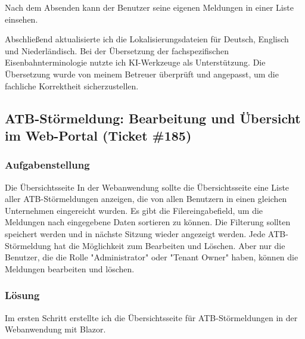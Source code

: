     
    Nach dem Absenden kann der Benutzer seine eigenen Meldungen in einer Liste einsehen.

    Abschließend aktualisierte ich die Lokalisierungsdateien für Deutsch, Englisch und Niederländisch.
    Bei der Übersetzung der fachspezifischen Eisenbahnterminologie nutzte ich KI-Werkzeuge
    als Unterstützung. Die Übersetzung wurde von meinem Betreuer überprüft und angepasst, um die fachliche Korrektheit sicherzustellen.


\subsection{ATB-Störmeldung: Bearbeitung und Übersicht im Web-Portal (Ticket \#185)}

    \subsubsection{Aufgabenstellung}
    Die Übersichtsseite In der Webanwendung sollte die Übersichtsseite eine Liste aller ATB-Störmeldungen anzeigen, 
    die von allen Benutzern in einen gleichen Unternehmen eingereicht wurden.
    Es gibt die Filereingabefield, um die Meldungen nach eingegebene Daten sortieren zu können. Die Filterung sollten speichert werden und in nächste Sitzung wieder angezeigt werden.
    Jede ATB-Störmeldung hat die Möglichkeit zum Bearbeiten und Löschen. Aber nur die Benutzer, die die Rolle "Administrator" oder "Tenant Owner" haben, können die Meldungen bearbeiten und löschen.

    \subsubsection{Lösung}
    Im ersten Schritt erstellte ich die Übersichtsseite für ATB-Störmeldungen in der Webanwendung mit Blazor.